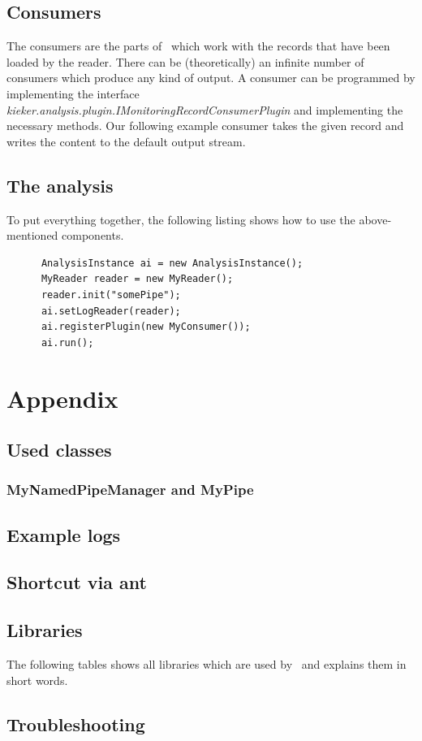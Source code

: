 \documentclass[a4paper, oneside, 11pt]{scrartcl}
\begin{document}
      \subsection{Consumers}
	The consumers are the parts of \Kieker\ which work with the records that have been loaded by the reader. There can be (theoretically) an infinite number of consumers which produce any kind of output. A consumer can be programmed by implementing the interface \textit{kieker.analysis.plugin.IMonitoringRecordConsumerPlugin} and implementing the necessary methods. Our following example consumer takes the given record and writes the content to the default output stream.
	\setJavaCodeListing
	\lstset{caption=MyConsumer.java}
	

      \subsection{The analysis}
	To put everything together, the following listing shows how to use the above-mentioned components.
	\setJavaCodeListing
	\begin{lstlisting}
	  AnalysisInstance ai = new AnalysisInstance();
	  MyReader reader = new MyReader();
	  reader.init("somePipe");
	  ai.setLogReader(reader);
	  ai.registerPlugin(new MyConsumer());
	  ai.run();
	\end{lstlisting}

  \section{Appendix}
    \subsection{Used classes}
      \subsubsection{MyNamedPipeManager and MyPipe}
	\setJavaCodeListing
	\lstset{caption=MyNamedPipeManager.java}
	

	\setJavaCodeListing
	\lstset{caption=MyPipe.java}
	

    \subsection{Example logs}
    \subsection{Shortcut via ant}
    \subsection{Libraries}
      The following tables shows all libraries which are used by \Kieker\ and explains them in short words.
      
    \subsection{Troubleshooting}
\end{document}
